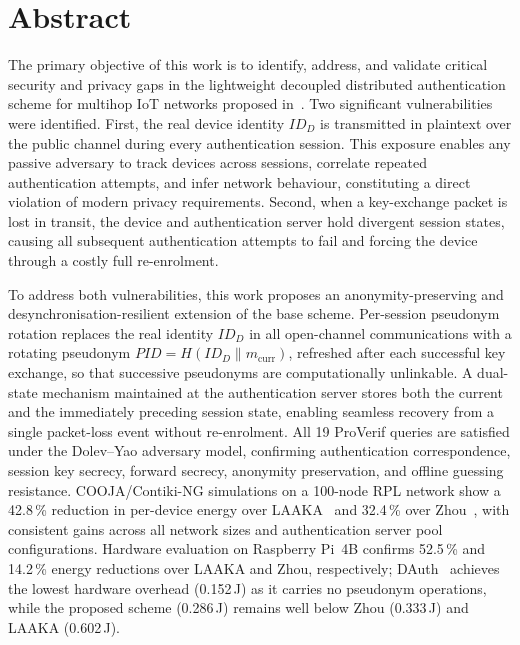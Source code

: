 \documentclass[12pt,a4paper]{report}
\begin{document}

\chapter*{Abstract}
\setcounter{page}{1}

The primary objective of this work is to identify, address, and validate critical
security and privacy gaps in the lightweight decoupled distributed authentication
scheme for multihop IoT networks proposed in~\cite{das2026comsnets}.
Two significant vulnerabilities were identified.
First, the real device identity $ID_D$ is transmitted in plaintext over the public
channel during every authentication session.
This exposure enables any passive adversary to track devices across sessions,
correlate repeated authentication attempts, and infer network behaviour, constituting
a direct violation of modern privacy requirements.
Second, when a key-exchange packet is lost in transit, the device and authentication
server hold divergent session states, causing all subsequent authentication attempts
to fail and forcing the device through a costly full re-enrolment.

To address both vulnerabilities, this work proposes an anonymity-preserving and
desynchronisation-resilient extension of the base scheme.
Per-session pseudonym rotation replaces the real identity $ID_D$ in all
open-channel communications with a rotating pseudonym
$\mathit{PID} = H(ID_D \| m_{\mathrm{curr}})$, refreshed after each successful
key exchange, so that successive pseudonyms are computationally unlinkable.
A dual-state mechanism maintained at the authentication server stores both the
current and the immediately preceding session state, enabling seamless recovery
from a single packet-loss event without re-enrolment.
All 19 ProVerif queries are satisfied under the Dolev--Yao adversary model,
confirming authentication correspondence, session key secrecy, forward secrecy,
anonymity preservation, and offline guessing resistance.
COOJA/Contiki-NG simulations on a 100-node RPL network show a 42.8\,\% reduction
in per-device energy over LAAKA~\cite{ali2024laaka} and 32.4\,\% over
Zhou~\cite{zhou2024auth}, with consistent gains across all network sizes and
authentication server pool configurations.
Hardware evaluation on Raspberry Pi~4B confirms
52.5\,\% and 14.2\,\% energy reductions over LAAKA and Zhou, respectively;
DAuth~\cite{das2026comsnets} achieves the lowest hardware overhead (0.152\,J) as
it carries no pseudonym operations, while the proposed scheme (0.286\,J) remains
well below Zhou (0.333\,J) and LAAKA (0.602\,J).
\end{document}
